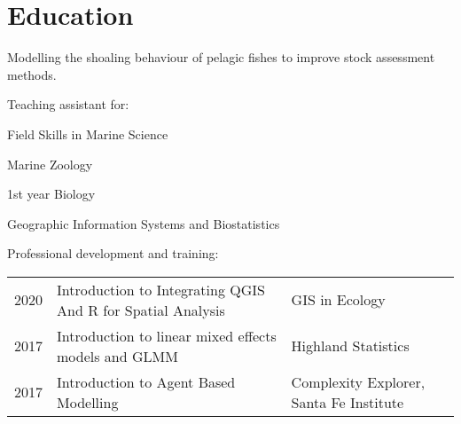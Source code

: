 \documentclass[a4paper]{deedy-resume} %
\begin{document}




\sectionspace
\section{Education} 

Modelling the shoaling behaviour of pelagic fishes to improve stock assessment methods.


\sectionspace %

Teaching assistant for:
\begin{tightitemize}
\item Field Skills in Marine Science
\item Marine Zoology
\item 1st year Biology
\item Geographic Information Systems and Biostatistics
\end{tightitemize}

\sectionspace %

Professional development and training:
\begin{tabular}{ l l l }
2020 & Introduction to Integrating QGIS And R for Spatial Analysis & GIS in Ecology \\
2017 & Introduction to linear mixed effects models and GLMM & Highland Statistics \\
2017 & Introduction to Agent Based Modelling & Complexity Explorer, Santa Fe Institute
\end{tabular}
\end{document}
